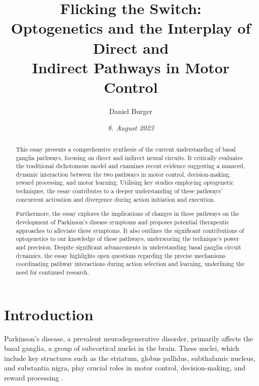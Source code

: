 \documentclass[10pt]{article}
\title{\textbf{Flicking the Switch: } \\ Optogenetics and the Interplay of Direct and \\ Indirect Pathways in Motor Control}
\author[ ]{Daniel Burger}
\affil[ ]{\textbf{King’s College London}}
\affil[ ]{\href{mailto:public@danielburger.online}{public@danielburger.online}}
\date{\textit{8. August 2023}}
\begin{document}

\maketitle
\thispagestyle{empty}


\begin{sloppypar} %
  \begin{abstract}
    This essay presents a comprehensive synthesis of the current understanding of basal ganglia pathways, focusing on direct and indirect neural circuits. It critically evaluates the traditional dichotomous model and examines recent evidence suggesting a nuanced, dynamic interaction between the two pathways in motor control, decision-making, reward processing, and motor learning. Utilising key studies employing optogenetic techniques, the essay contributes to a deeper understanding of these pathways’ concurrent activation and divergence during action initiation and execution.

    Furthermore, the essay explores the implications of changes in these pathways on the development of Parkinson’s disease symptoms and proposes potential therapeutic approaches to alleviate these symptoms. It also outlines the significant contributions of optogenetics to our knowledge of these pathways, underscoring the technique’s power and precision. Despite significant advancements in understanding basal ganglia circuit dynamics, the essay highlights open questions regarding the precise mechanisms coordinating pathway interactions during action selection and learning, underlining the need for continued research.
  \end{abstract}
  \pagebreak

  \tableofcontents
  \pagebreak

  \listoffigures
  \pagebreak



  \section{Introduction}
  \label{sec:introduction}

  Parkinson’s disease, a prevalent neurodegenerative disorder, primarily affects the basal ganglia, a group of subcortical nuclei in the brain. These nuclei, which include key structures such as the striatum, globus pallidus, subthalamic nucleus, and substantia nigra, play crucial roles in motor control, decision-making, and reward processing \citep{zhang_oculomotor_2018,ojagbemi_neuropsychiatric_2013}.


\end{sloppypar}
\end{document}

